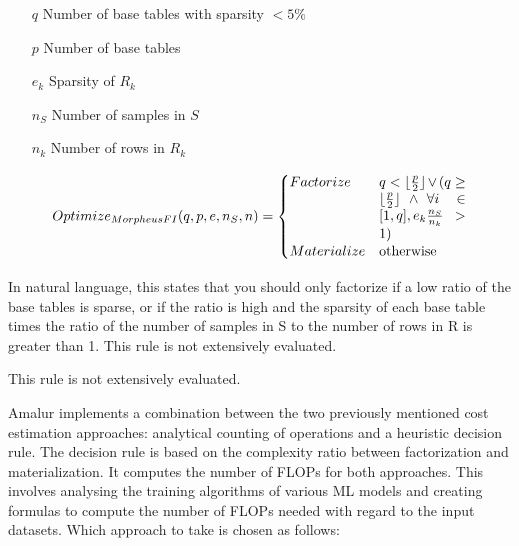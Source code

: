 \begin{definition}
    \begin{itemize}
        \item[]
            \item[$q$]Number of base tables with sparsity $ < 5\% $
        \item[$p$] Number of base tables
        \item[$e_k$] Sparsity of $R_k$
        \item[$n_S$] Number of samples in $S$
        \item[$n_k$] Number of rows in $R_k$
    \end{itemize}

    \begin{align*}
        \begin{split}
            Optimize_{MorpheusFI}(q, p, e, n_S, n) =
            \begin{cases}
                Factorize   & \parbox[t]{.18\linewidth}{$q < \lfloor \frac{p}{2} \rfloor \vee ( q \geq \lfloor \frac{p}{2} \rfloor \wedge \forall i \in [1,q], e_k \frac{n_S}{n_k} > 1)$} \\
                Materialize & \text{otherwise}
            \end{cases}
        \end{split}
    \end{align*}
\end{definition}

In natural language, this states that you should only factorize if a low ratio of the base tables is sparse, or if the ratio is high and the sparsity of each base table times the ratio of the number of samples in S to the number of rows in R is greater than 1. This rule is not extensively evaluated.

This rule is not extensively evaluated. 

Amalur \cite{schijndel_cost_estimation} implements a combination between the two previously mentioned cost estimation approaches: analytical counting of operations and a heuristic decision rule. The decision rule is based on the complexity ratio between factorization and materialization. It computes the number of FLOPs for both approaches. This involves analysing the training algorithms of various ML models and creating formulas to compute the number of FLOPs needed with regard to the input datasets. Which approach to take is chosen as follows:

